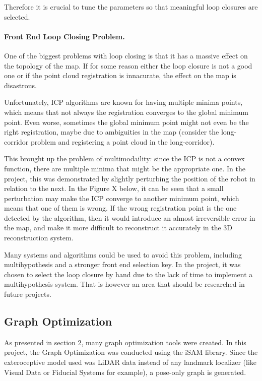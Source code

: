 \documentclass[12pt]{article}
\begin{document}
Therefore it is crucial to tune the parameters so that meaningful loop closures are selected. 

\paragraph{Front End Loop Closing Problem.} One of the biggest problems with loop closing is that it has a massive effect on the topology of the map. If for some reason either the loop closure is not a good one or if the point cloud registration is innacurate, the effect on the map is disastrous.
	
Unfortunately, ICP algorithms are known for having multiple minima points, which means that not always the registration converges to the global minimum point. Even worse, sometimes the global minimum point might not even be the right registration, maybe due to ambiguities in the map (consider the long-corridor problem and registering a point cloud in the long-corridor).
	
This brought up the problem of multimodaility: since the ICP is not a convex function, there are multiple minima that might be the appropriate one. In the project, this was demonstrated by slightly perturbing the position of the robot in relation to the next. In the Figure X below, it can be seen that a small perturbation may make the ICP converge to another minimum point, which means that one of them is wrong. If the wrong registration point is the one detected by the algorithm, then it would introduce an almost irreversible error in the map, and make it more difficult to reconstruct it accurately in the 3D reconstruction system.
	
Many systems and algorithms could be used to avoid this problem, including multihypothesis and a stronger front end selection key. In the project, it was chosen to select the loop closure by hand due to the lack of time to implement a multihypothesis system. That is however an area that should be researched in future projects.

	\subsection{Graph Optimization}
	\label{subs:GraphOpt}

As presented in section 2, many graph optimization tools were created. In this project, the Graph Optimization was conducted using the iSAM library. Since the exteroceptive model used was LiDAR data instead of any landmark localizer (like Visual Data or Fiducial Systems for example), a pose-only graph is generated.
\end{document}
